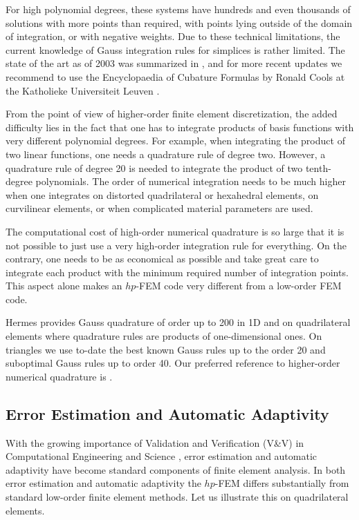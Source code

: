 \documentclass[final,3p,times,twocolumn]{elsarticle}
\begin{document}
For high polynomial degrees, these systems have hundreds
and even thousands of solutions with more points than required, with points 
lying outside of the domain of integration, or with 
negative weights. Due to these technical limitations, the current 
knowledge of Gauss
integration rules for simplices is rather limited. 
The state of the art as of 2003 was summarized 
in \cite{sosedo}, and for more recent updates we recommend
to use the Encyclopaedia of Cubature Formulas by Ronald 
Cools at the Katholieke Universiteit Leuven \cite{cools}.

From the point of view of higher-order finite element
discretization, the added difficulty lies in the 
fact that one has to integrate products of basis functions
with very different polynomial degrees. For example, 
when integrating the product of two linear functions,
one needs a quadrature rule of degree two. However, 
a quadrature rule of degree 20 is needed to integrate 
the product of two tenth-degree polynomials. The order 
of numerical integration needs to be much higher when 
one integrates on distorted quadrilateral or hexahedral 
elements, on curvilinear elements, or when complicated
material parameters are used.  

The computational cost of high-order numerical quadrature 
is so large that it is not possible to just use
a very high-order integration rule for everything. On the 
contrary, one needs to be as economical as possible and 
take great care to integrate each product with the minimum 
required number of integration points. This aspect alone 
makes an $hp$-FEM code very different from a low-order FEM 
code. 

Hermes provides Gauss quadrature of order up to 200 in 1D
and on quadrilateral elements where quadrature rules are 
products of one-dimensional ones. On triangles we use to-date 
the best known Gauss rules up to the order 20 and suboptimal 
Gauss rules up to order 40. Our preferred reference to 
higher-order numerical quadrature is \cite{cools}.

\subsection{Error Estimation and Automatic Adaptivity}\label{subsec:cand}

With the growing importance of Validation and
Verification (V\&V) in Computational Engineering and Science
\cite{v-v}, error estimation and automatic
adaptivity have become standard components of 
finite element analysis. 
In both error estimation and automatic adaptivity 
the $hp$-FEM differs substantially from standard 
low-order
finite element methods. Let us illustrate this 
on quadrilateral elements. 
\end{document}
